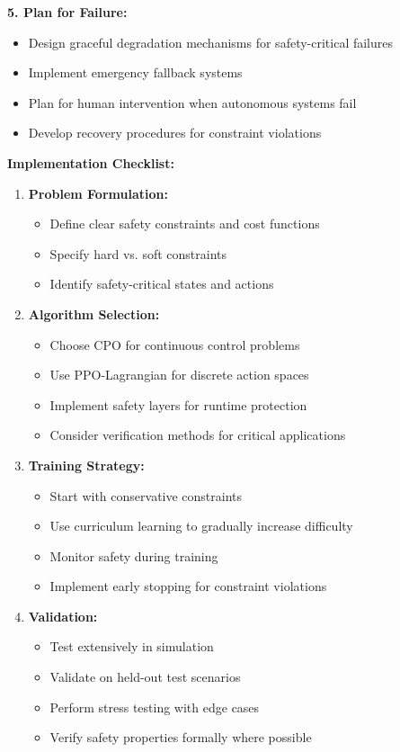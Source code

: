 \documentclass[12pt]{article}
\begin{document}
{{{{\textbf{5. Plan for Failure:}
\begin{itemize}
\item Design graceful degradation mechanisms for safety-critical failures
\item Implement emergency fallback systems
\item Plan for human intervention when autonomous systems fail
\item Develop recovery procedures for constraint violations
\end{itemize}

\textbf{Implementation Checklist:}
\begin{enumerate}
\item \textbf{Problem Formulation:}
   \begin{itemize}
   \item Define clear safety constraints and cost functions
   \item Specify hard vs. soft constraints
   \item Identify safety-critical states and actions
   \end{itemize}

\item \textbf{Algorithm Selection:}
   \begin{itemize}
   \item Choose CPO for continuous control problems
   \item Use PPO-Lagrangian for discrete action spaces
   \item Implement safety layers for runtime protection
   \item Consider verification methods for critical applications
   \end{itemize}

\item \textbf{Training Strategy:}
   \begin{itemize}
   \item Start with conservative constraints
   \item Use curriculum learning to gradually increase difficulty
   \item Monitor safety during training
   \item Implement early stopping for constraint violations
   \end{itemize}

\item \textbf{Validation:}
   \begin{itemize}
   \item Test extensively in simulation
   \item Validate on held-out test scenarios
   \item Perform stress testing with edge cases
   \item Verify safety properties formally where possible
   \end{itemize}


\end{enumerate}}}}}
\end{document}
